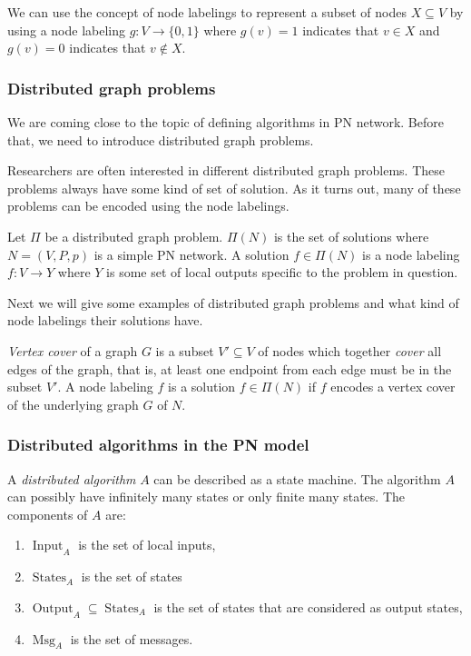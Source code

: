 We can use the concept of node labelings to represent a subset of nodes $X \subseteq V$ by using a node labeling $g: V \rightarrow \{0,1\}$ where $g(v) = 1$ indicates that $v \in X$ and $g(v) = 0$ indicates that $v \notin X$.



\subsubsection{Distributed graph problems}
We are coming close to the topic of defining algorithms in PN network.
Before that, we need to introduce distributed graph problems.

Researchers are often interested in different distributed graph problems.
These problems always have some kind of set of solution.
As it turns out, many of these problems can be encoded using the node labelings.

Let $\Pi$ be a distributed graph problem.
$\Pi(N)$ is the set of solutions where $N=(V, P, p)$ is a simple PN network.
A solution $f \in \Pi(N)$ is a node labeling $f: V \rightarrow Y$ where $Y$ is some set of local outputs specific to the problem in question.

Next we will give some examples of distributed graph problems and what kind of node labelings their solutions have.

\emph{Vertex cover} of a graph $G$ is a subset $V' \subseteq V$ of nodes which together \emph{cover} all edges of the graph, that is, at least one endpoint from each edge must be in the subset $V'$.
A node labeling $f$ is a solution $f \in \Pi(N)$ if $f$ encodes a vertex cover of the underlying graph $G$ of $N$.

\subsubsection{Distributed algorithms in the PN model}

\newcommand{\algin}{\operatorname{Input}}
\newcommand{\algstates}{\operatorname{States}}
\newcommand{\algout}{\operatorname{Output}}
\newcommand{\algmsg}{\operatorname{Msg}}

\newcommand{\alginit}{\operatorname{init}}
\newcommand{\algsend}{\operatorname{send}}
\newcommand{\algrecv}{\operatorname{receive}}

A \emph{distributed algorithm} $A$ can be described as a state machine.
The algorithm $A$ can possibly have infinitely many states or only finite many states.
The components of $A$ are:
\begin{enumerate}
  \item $\algin_A$ is the set of local inputs,
  \item $\algstates_A$ is the set of states
  \item $\algout_A \subseteq \algstates_A$ is the set of states that are considered as output states,
  \item $\algmsg_A$ is the set of messages.
\end{enumerate}

